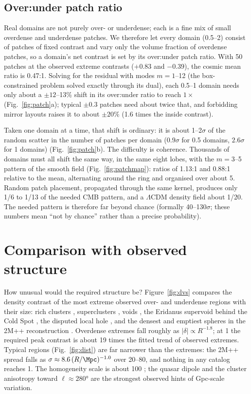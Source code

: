 \documentclass[aps,prd,twocolumn,nofootinbib,superscriptaddress,floatfix]{revtex4-2}
\begin{document}
\subsection{Over:under patch ratio}\label{sec:patch}
Real domains are not purely over- or underdense; each is a fine mix of small overdense and underdense patches. We therefore let every domain (\SIrange{0.5}{2}{\Gpc}) consist of patches of fixed contrast and vary only the volume fraction of overdense patches, so a domain's net contrast is set by its over:under patch ratio. With \SI{50}{\Mpc} patches at the observed extreme contrasts ($+0.83$ and $-0.39$), the cosmic mean ratio is 0.47:1. Solving for the residual with modes $m=1$--12 (the box-constrained problem solved exactly through its dual), each 0.5--\SI{1}{\Gpc} domain needs only about a $\pm12$--13\% shift in its over:under ratio to reach $1\times$ (Fig.~\ref{fig:patch}a); typical $\pm0.3$ patches need about twice that, and forbidding mirror layouts raises it to about $\pm20\%$ (1.6 times the inside contrast).

Taken one domain at a time, that shift is ordinary: it is about 1--2$\sigma$ of the random scatter in the number of patches per domain ($0.9\sigma$ for \SI{0.5}{\Gpc} domains, $2.6\sigma$ for \SI{1}{\Gpc} domains) (Fig.~\ref{fig:patch}b). The difficulty is coherence. Thousands of domains must all shift the same way, in the same eight lobes, with the $m=3$--5 pattern of the smooth field (Fig.~\ref{fig:patchmap}): ratios of 1.13:1 and 0.88:1 relative to the mean, alternating around the ring and organised over about \SI{5}{\Gpc}. Random patch placement, propagated through the same kernel, produces only 1/6 to 1/13 of the needed CMB pattern, and a $\Lambda$CDM density field about 1/20. The needed pattern is therefore far beyond chance (formally 40--130$\sigma$; these numbers mean ``not by chance'' rather than a precise probability).

\section{Comparison with observed structure}
How unusual would the required structure be? Figure~\ref{fig:dvs} compares the density contrast of the most extreme observed over- and underdense regions with their size: rich clusters \cite{Tinker2008,Rykoff2014,Simet2017}, superclusters \cite{Liivamagi2012}, voids \cite{ClampittJain2015,Mao2017,Hamaus2014}, the Eridanus supervoid behind the Cold Spot \cite{Szapudi2015,Kovacs2016}, the disputed local hole \cite{Keenan2013,Whitbourn2014,Kenworthy2019}, and the densest and emptiest spheres in the 2M++ reconstruction \cite{Carrick2015}. Overdense extremes fall roughly as $|\delta|\propto R^{-1.8}$; at \SI{1}{\Gpc} the required peak contrast is about 19 times the fitted trend of observed extremes. Typical regions (Fig.~\ref{fig:dist}) are far narrower than the extremes: the 2M++ spread falls as $\sigma\approx8.6\,(R/\si{\Mpc})^{-1.0}$ over \SIrange{20}{80}{\Mpc}, and nothing in any catalog reaches \SI{1}{\Gpc}. The homogeneity scale is about \SI{100}{\Mpc} \cite{Scrimgeour2012}; the quasar dipole \cite{Secrest2021} and the cluster anisotropy toward $\ell\approx\ang{280}$ \cite{Migkas2020} are the strongest observed hints of Gpc-scale variation.
\end{document}
